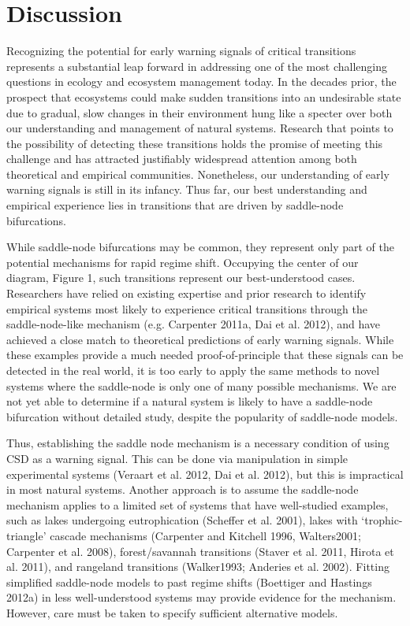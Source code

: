 \documentclass{article}
\begin{document}
\section{Discussion}

Recognizing the potential for early warning signals of critical
transitions represents a substantial leap forward in addressing one of
the most challenging questions in ecology and ecosystem management
today. In the decades prior, the prospect that ecosystems could make
sudden transitions into an undesirable state due to gradual, slow
changes in their environment hung like a specter over both our
understanding and management of natural systems. Research that points to
the possibility of detecting these transitions holds the promise of
meeting this challenge and has attracted justifiably widespread
attention among both theoretical and empirical communities. Nonetheless,
our understanding of early warning signals is still in its infancy. Thus
far, our best understanding and empirical experience lies in transitions
that are driven by saddle-node bifurcations.

While saddle-node bifurcations may be common, they represent only part
of the potential mechanisms for rapid regime shift. Occupying the center
of our diagram, Figure 1, such transitions represent our best-understood
cases. Researchers have relied on existing expertise and prior research
to identify empirical systems most likely to experience critical
transitions through the saddle-node-like mechanism (e.g. Carpenter
2011a, Dai et al. 2012), and have achieved a close match to theoretical
predictions of early warning signals. While these examples provide a
much needed proof-of-principle that these signals can be detected in the
real world, it is too early to apply the same methods to novel systems
where the saddle-node is only one of many possible mechanisms. We are
not yet able to determine if a natural system is likely to have a
saddle-node bifurcation without detailed study, despite the popularity
of saddle-node models.

Thus, establishing the saddle node mechanism is a necessary condition of
using CSD as a warning signal. This can be done via manipulation in
simple experimental systems (Veraart et al. 2012, Dai et al. 2012), but
this is impractical in most natural systems. Another approach is to
assume the saddle-node mechanism applies to a limited set of systems
that have well-studied examples, such as lakes undergoing eutrophication
(Scheffer et al. 2001), lakes with `trophic-triangle' cascade mechanisms
(Carpenter and Kitchell 1996, Walters2001; Carpenter et al. 2008),
forest/savannah transitions (Staver et al. 2011, Hirota et al. 2011),
and rangeland transitions (Walker1993; Anderies et al. 2002). Fitting
simplified saddle-node models to past regime shifts (Boettiger and
Hastings 2012a) in less well-understood systems may provide evidence for
the mechanism. However, care must be taken to specify sufficient
alternative models.
\end{document}
